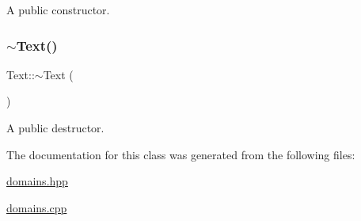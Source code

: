 A public constructor. \mbox{\label{class_text_a2d49e5c280e205125b149f7777ae30c7}} 
\subsubsection{\texorpdfstring{$\sim$\+Text()}{~Text()}}
{\footnotesize\ttfamily Text\+::$\sim$\+Text (\begin{DoxyParamCaption}{ }\end{DoxyParamCaption})}

A public destructor. 

The documentation for this class was generated from the following files\+:\begin{DoxyCompactItemize}
\item 
\hyperlink{domains_8hpp}{domains.\+hpp}\item 
\hyperlink{domains_8cpp}{domains.\+cpp}\end{DoxyCompactItemize}

